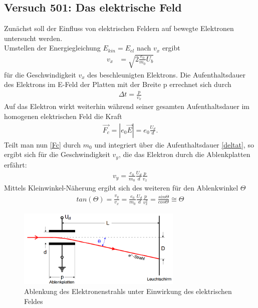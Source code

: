 \subsection{Versuch 501: Das elektrische Feld}
Zunächst soll der Einfluss von elektrischen Feldern auf bewegte Elektronen untersucht werden.\\
Umstellen der Energiegleichung $E_{kin}=E_{el}$ nach $v_x$ ergibt
\begin{align} 
v_x&=\sqrt{2\frac{e_0}{m_0}U_b}
\label{vx}
\end{align}
für die Geschwindigkeit $v_x$ des beschleunigten Elektrons.
Die Aufenthaltsdauer des Elektrons im E-Feld der Platten mit der Breite p errechnet sich durch
\begin{align}
\Delta t=\frac{p}{v_x}
\label{deltat}
\end{align}
Auf das Elektron wirkt weiterhin während seiner gesamten Aufenthaltsdauer im homogenen elektrischen Feld die Kraft 
\begin{align}
\vec{F_c}=|e_0\vec{E}|=e_0\frac{U_d}{d}.
\label{Fc}
\end{align}
Teilt man nun \eqref{Fc} durch $m_0$ und integriert über die Aufenthaltsdauer \eqref{deltat}, so ergibt sich für die Geschwindigkeit $v_y$, die das Elektron durch die Ablenkplatten erfährt:
\begin{align}
v_y=\frac{e_0}{m_0}\frac{U_d}{d}\frac{p}{v_x}
\end{align}
Mittels Kleinwinkel-Näherung ergibt sich des weiteren für den Ablenkwinkel $\Theta$
\begin{align*}
tan(\Theta)=\frac{v_y}{v_x}=\frac{e_0}{m_0}\frac{U_d}{d}\frac{p}{v^2_x}=\frac{sin\Theta}{cos\Theta}\cong \Theta
\end{align*}

\begin{figure}[htbp]
\includegraphics[width=0.7\textwidth] {pics/Ablenkung_E.png}
\centering
\caption{Ablenkung des Elektronenstrahls unter Einwirkung des elektrischen Feldes}
\label{abl_E}
\end{figure}

